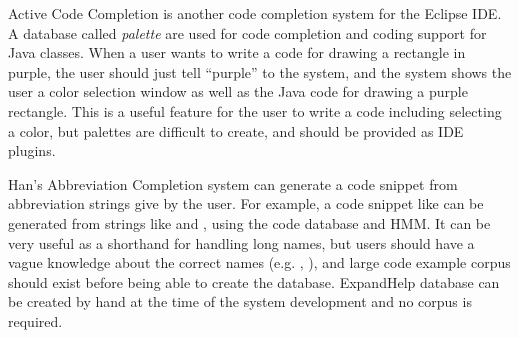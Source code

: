 \documentclass{sigchi}
\def\EH{\textsf{ExpandHelp}}
\begin{document}
Active Code Completion\cite{Omar:2012:ACC:2337223.2337324}
is another code completion system for the Eclipse IDE.
A database called \textit{palette} are used for code completion and coding support
for Java classes.
When a user wants to write a code for drawing a rectangle in purple,
the user should just tell ``purple'' to the system,
and the system shows the user a color selection window
as well as the Java code for drawing a purple rectangle.
This is a useful feature for the user to write a code including selecting
a color, but palettes are difficult to create, and should be provided
as IDE plugins.

Han's Abbreviation Completion system\cite{Han:2009:CCA:1747491.1747530}
can generate a code snippet from abbreviation strings give by the user.
For example, a code snippet like 
can be generated from strings like
 and , using the code database and HMM.
It can be very useful as a shorthand for handling long names,
but users should have a vague knowledge about the correct names
(e.g. , ),
and large code example corpus should exist before being able to
create the database.
{\EH} database can be created by hand at the time of the system development
and no corpus is required.

\end{document}
